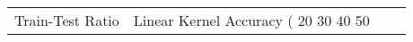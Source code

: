 \begin{tabular}{lrrr}
\toprule
Train-Test Ratio & Linear Kernel Accuracy (%
\midrule
10%
20%
30%
40%
50%
\bottomrule
\end{tabular}
